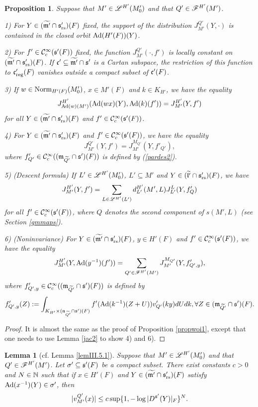 \documentclass[a4paper]{amsart}
\newcommand{\fm}{{\mathfrak{m}}} \newcommand{\fn}{{\mathfrak{n}}}\newcommand{\fo}{{\mathfrak{o}}} \newcommand{\fp}{{\mathfrak{p}}}
\newcommand{\wt}{\widetilde}                        \newcommand{\wh}{\widehat}                      \newcommand{\wpair}[1]{\left\{{#1}\right\}}
\newtheorem{lem}[thm]{Lemma}
\newtheorem{prop}[thm]{Proposition}
\theoremstyle{definition}
\theoremstyle{remark}
\numberwithin{equation}{subsection}
\begin{document}
\begin{prop}\label{propwoi2}
Suppose that $M'\in\mathscr{L}^{H'}(M'_0)$ and that $Q'\in\mathscr{F}^{H'}(M')$. 

1) For $Y\in(\wt{\fm'}\cap\fs'_\rs)(F)$ fixed, the support of the distribution $J_{M'}^{Q'}(Y, \cdot)$ is contained in the closed orbit ${\mathrm{Ad}}(H'(F))(Y)$. 

2) For $f'\in {\mathcal {C}}_c^\infty({\mathfrak{s}}'(F))$ fixed, the function $J_{M'}^{Q'}(\cdot, f')$ is locally constant  on $(\wt{\fm'}\cap\fs'_\rs)(F)$. If $\fc'\subseteq\wt{\fm'}\cap\fs'$ is a Cartan subspace, the restriction of this function to ${\mathfrak{c}}'_{\mathrm{reg}}(F)$ vanishes outside a compact subset of ${\mathfrak{c}}'(F)$. 

3) If $w\in {\mathrm{Norm}}_{H'(F)}(M'_0)$, $x\in M'(F)$ and $k\in K_{H'}$, we have the equality
$$ J_{{\mathrm{Ad}}(w)(M')}^{H'}({\mathrm{Ad}}(wx)(Y), {\mathrm{Ad}}(k)(f'))=J_{M'}^{H'}(Y, f') $$
for all $Y\in(\wt{\fm'}\cap\fs'_\rs)(F)$ and $f'\in{\mathcal {C}}_c^\infty({\mathfrak{s}}'(F))$. 

4) For $Y\in(\wt{\fm'}\cap\fs'_\rs)(F)$ and $f'\in{\mathcal {C}}_c^\infty({\mathfrak{s}}'(F))$, we have the equality
$$ J_{M'}^{Q'}(Y, f')=J_{M'}^{M_{Q'}}(Y, f'_{Q'}), $$
where $f'_{Q'}\in\CC_c^\infty((\fm_{\wt{Q'}}\cap\fs')(F))$ is defined by (\ref{pardes2}). 

5) (Descent formula) If $L'\in\mathscr{L}^{H'}(M'_0)$, $L'\subseteq M'$ and $Y\in(\wt{\fl'}\cap\fs'_\rs)(F)$, we have
$$ J_{M'}^{H'}(Y, f')=\sum_{L\in\mathscr{L}^{H'}(L')} d_{L'}^{H'}(M', L) J_{L'}^L(Y, f'_Q) $$
for all $f'\in{\mathcal {C}}_c^\infty({\mathfrak{s}}'(F))$, where $Q$ denotes the second component of $s(M',L)$ (see Section \ref{gmmaps}). 

6) (Noninvariance) For $Y\in(\wt{\fm'}\cap\fs'_\rs)(F)$, $y\in H'(F)$ and $f'\in{\mathcal {C}}_c^\infty({\mathfrak{s}}'(F))$, we have the equality
$$ J_{M'}^{H'}(Y, {\mathrm{Ad}}(y^{-1})(f'))=\sum_{Q'\in\mathscr{F}^{H'}(M')} J_{M'}^{M_{Q'}}(Y, f'_{Q',y}), $$
where $f'_{Q',y}\in\CC_c^\infty((\fm_{\wt{Q'}}\cap\fs')(F))$ is defined by
\begin{equation}\label{nonequcst2}
 f'_{Q',y}(Z):=\int_{K_{H'}\times(\fn_{\wt{Q'}}\cap\fs')(F)} f'(\Ad(k^{-1})(Z+U)) v'_{Q'}(ky) dUdk, \forall Z\in(\fm_{\wt{Q'}}\cap\fs')(F). 
\end{equation}
\end{prop}

\begin{proof}
It is almost the same as the proof of Proposition \ref{propwoi1}, except that one needs to use Lemma \ref{jac2} to show 4) and 6). 
\end{proof}

\begin{lem}[cf. Lemma \ref{lemIII.5.1}]\label{lemIII.5.2}
Suppose that $M'\in\mathscr{L}^{H'}(M'_0)$ and that $Q'\in\mathscr{F}^{H'}(M')$. Let $\sigma'\subseteq{\mathfrak{s}}'(F)$ be a compact subset. There exist constants $c>0$ and $N\in{\mathbb {N}}$ such that if $x\in H'(F)$ and $Y\in(\wt{\fm'}\cap\fs'_\rs)(F)$ satisfy ${\mathrm{Ad}}(x^{-1})(Y)\in\sigma'$, then
$$ |v_{M'}^{Q'}(x)|\leq c\sup\{1, -\log |D^{{\mathfrak{s}}'}(Y)|_F\}^N. $$
\end{lem}
\end{document}
